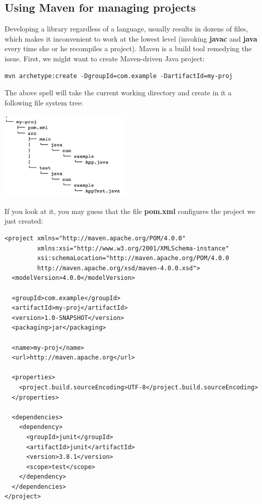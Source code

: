 \documentclass[oneside]{book}
\begin{document}
\subsection{Using Maven for managing projects}
Developing a library regardless of a language, usually results in dozens of files, which makes it inconvenient to work at the lowest level (invoking \textbf{javac} and \textbf{java} every time she or he recompiles a project). Maven is a build tool remedying the issue. First, we might want to create Maven-driven Java project:
\begin{verbatim}
mvn archetype:create -DgroupId=com.example -DartifactId=my-proj
\end{verbatim}
The above spell will take the current working directory and create in it a following file system tree:
\begin{center}
\includegraphics[width=240px,keepaspectratio]{mvntree}
\end{center}
If you look at it, you may guess that the file \textbf{pom.xml} configures the project we just created:
\begin{lstlisting}
<project xmlns="http://maven.apache.org/POM/4.0.0"
         xmlns:xsi="http://www.w3.org/2001/XMLSchema-instance"
         xsi:schemaLocation="http://maven.apache.org/POM/4.0.0
         http://maven.apache.org/xsd/maven-4.0.0.xsd">
  <modelVersion>4.0.0</modelVersion>

  <groupId>com.example</groupId>
  <artifactId>my-proj</artifactId>
  <version>1.0-SNAPSHOT</version>
  <packaging>jar</packaging>

  <name>my-proj</name>
  <url>http://maven.apache.org</url>

  <properties>
    <project.build.sourceEncoding>UTF-8</project.build.sourceEncoding>
  </properties>

  <dependencies>
    <dependency>
      <groupId>junit</groupId>
      <artifactId>junit</artifactId>
      <version>3.8.1</version>
      <scope>test</scope>
    </dependency>
  </dependencies>
</project>
\end{lstlisting}
\end{document}
